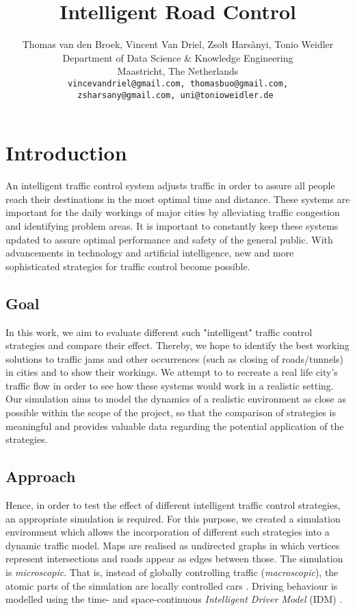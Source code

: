 \documentclass[10pt]{article}
\title{Intelligent Road Control}
\author{Thomas van den Broek, Vincent Van Driel, Zsolt Harsànyi, Tonio Weidler\\
	Department of Data Science \& Knowledge Engineering\\
	Maastricht, The Netherlands\\
	\tt \small vincevandriel@gmail.com, thomasbuo@gmail.com,\\
	\tt \small zsharsany@gmail.com, uni@tonioweidler.de
}
\begin{document}
\maketitle

\section{Introduction}
An intelligent traffic control system adjusts traffic in order to assure all people reach their destinations in the most optimal time and distance. These systems are important for the daily workings of major cities by alleviating traffic congestion and identifying problem areas.  It is important to constantly keep these systems updated to assure optimal performance and safety of the general public. With advancements in technology and artificial intelligence, new and more sophisticated strategies for traffic control become possible.

\subsection{Goal}
In this work, we aim to evaluate different such "intelligent" traffic control strategies and compare their effect. Thereby, we hope to identify the best working solutions to traffic jams and other occurrences (such as closing of roads/tunnels) in cities and to show their workings. We attempt to to recreate a real life city's traffic flow in order to see how these systems would work in a realistic setting. Our simulation aims to model the dynamics of a realistic environment as close as possible within the scope of the project, so that the comparison of strategies is meaningful and provides valuable data regarding the potential application of the strategies.

\subsection{Approach}
Hence, in order to test the effect of different intelligent traffic control strategies, an appropriate simulation is required. For this purpose, we created a simulation environment which allows the incorporation of different such strategies into a dynamic traffic model. Maps are realised as undirected graphs in which vertices represent intersections and roads appear as edges between those. The simulation is \textit{microscopic}. That is, instead of globally controlling traffic (\textit{macroscopic}), the atomic parts of the simulation are locally controlled cars \citep[see also][]{krajzewicz2002sumo}. Driving behaviour is modelled using the time- and space-continuous \textit{Intelligent Driver Model} (IDM) \citep{treiber2000congested}. 
\end{document}
